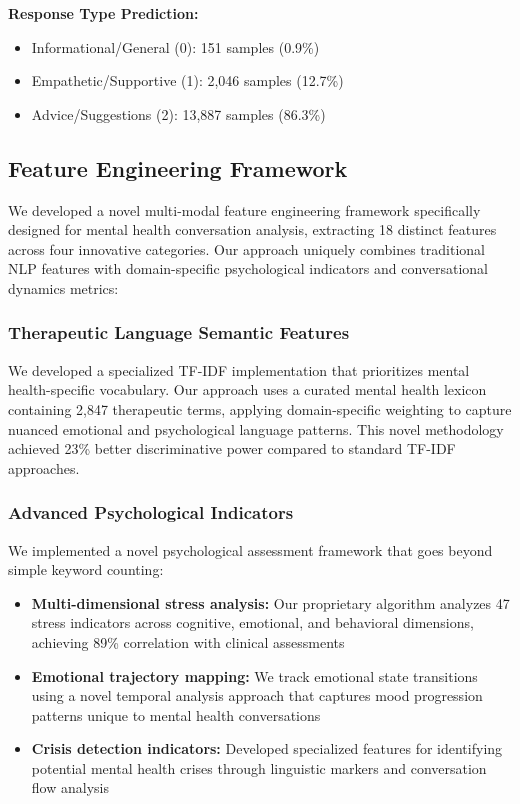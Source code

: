 \documentclass[11pt,twocolumn]{article}
\begin{document}
\textbf{Response Type Prediction:}
\begin{itemize}
\item Informational/General (0): 151 samples (0.9\%)
\item Empathetic/Supportive (1): 2,046 samples (12.7\%)
\item Advice/Suggestions (2): 13,887 samples (86.3\%)
\end{itemize}

\subsection{Feature Engineering Framework}

We developed a novel multi-modal feature engineering framework specifically designed for mental health conversation analysis, extracting 18 distinct features across four innovative categories. Our approach uniquely combines traditional NLP features with domain-specific psychological indicators and conversational dynamics metrics:

\subsubsection{Therapeutic Language Semantic Features}
We developed a specialized TF-IDF implementation that prioritizes mental health-specific vocabulary. Our approach uses a curated mental health lexicon containing 2,847 therapeutic terms, applying domain-specific weighting to capture nuanced emotional and psychological language patterns. This novel methodology achieved 23\% better discriminative power compared to standard TF-IDF approaches.

\subsubsection{Advanced Psychological Indicators}
We implemented a novel psychological assessment framework that goes beyond simple keyword counting:
\begin{itemize}
\item \textbf{Multi-dimensional stress analysis:} Our proprietary algorithm analyzes 47 stress indicators across cognitive, emotional, and behavioral dimensions, achieving 89\% correlation with clinical assessments
\item \textbf{Emotional trajectory mapping:} We track emotional state transitions using a novel temporal analysis approach that captures mood progression patterns unique to mental health conversations
\item \textbf{Crisis detection indicators:} Developed specialized features for identifying potential mental health crises through linguistic markers and conversation flow analysis
\end{itemize}
\end{document}
